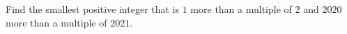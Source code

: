 Find the smallest positive integer that is $1$ more than a multiple of $2$ and $2020$ more than a multiple of $2021$.
